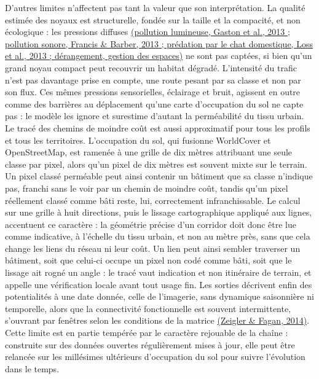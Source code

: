 \documentclass[a4paper,11pt]{report}
\begin{document}
D'autres limites n'affectent pas tant la valeur que son interprétation. La qualité estimée des noyaux est structurelle, fondée sur la taille et la compacité, et non écologique : les pressions diffuses \hyperref[sec:bibliographie]{(pollution lumineuse, Gaston et al., 2013 ; pollution sonore, Francis \& Barber, 2013 ; prédation par le chat domestique, Loss et al., 2013 ; dérangement, gestion des espaces)} ne sont pas captées, si bien qu'un grand noyau compact peut recouvrir un habitat dégradé. L'intensité du trafic n'est pas davantage prise en compte, une route pesant par sa classe et non par son flux. Ces mêmes pressions sensorielles, éclairage et bruit, agissent en outre comme des barrières au déplacement qu'une carte d'occupation du sol ne capte pas : le modèle les ignore et surestime d'autant la perméabilité du tissu urbain. Le tracé des chemins de moindre coût est aussi approximatif pour tous les profils et tous les territoires. L'occupation du sol, qui fusionne WorldCover et OpenStreetMap, est ramenée à une grille de dix mètres attribuant une seule classe par pixel, alors qu'un pixel de dix mètres est souvent mixte sur le terrain. Un pixel classé perméable peut ainsi contenir un bâtiment que sa classe n'indique pas, franchi sans le voir par un chemin de moindre coût, tandis qu'un pixel réellement classé comme bâti reste, lui, correctement infranchissable. Le calcul sur une grille à huit directions, puis le lissage cartographique appliqué aux lignes, accentuent ce caractère : la géométrie précise d'un corridor doit donc être lue comme indicative, à l'échelle du tissu urbain, et non au mètre près, sans que cela change les liens du réseau ni leur coût. Un lien peut ainsi sembler traverser un bâtiment, soit que celui-ci occupe un pixel non codé comme bâti, soit que le lissage ait rogné un angle : le tracé vaut indication et non itinéraire de terrain, et appelle une vérification locale avant tout usage fin. Les sorties décrivent enfin des potentialités à une date donnée, celle de l'imagerie, sans dynamique saisonnière ni temporelle, alors que la connectivité fonctionnelle est souvent intermittente, s'ouvrant par fenêtres selon les conditions de la matrice \hyperref[sec:bibliographie]{(Zeigler \& Fagan, 2014)}. Cette limite est en partie tempérée par le caractère rejouable de la chaîne : construite sur des données ouvertes régulièrement mises à jour, elle peut être relancée sur les millésimes ultérieurs d'occupation du sol pour suivre l'évolution dans le temps.
\end{document}
